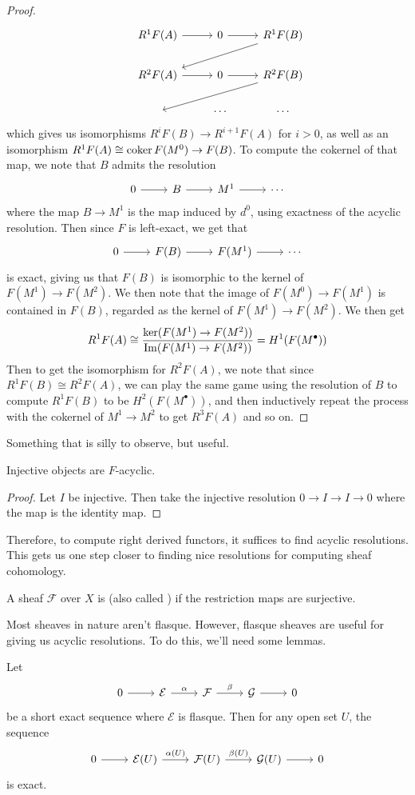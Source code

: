 \begin{proof}
\[\begin{tikzcd}
& R^1F(A) \ar[r] & 0 \ar[r] & R^1F(B) \ar[dll] \\
& R^2F(A) \ar[r] & 0 \ar[r] & R^2F(B) \ar[dll] \\
& ~ & \cdots & \cdots
\end{tikzcd}\]
which gives us isomorphisms $R^iF(B) \to R^{i+1}F(A)$ for $i > 0$, as well as
an isomorphism $R^1F(A) \cong \operatorname{coker} F(M^0) \to F(B)$. To compute the
cokernel of that map, we note that $B$ admits the resolution
\[\begin{tikzcd}
0 \ar[r] & B \ar[r] & M^1 \ar[r] & \cdots
\end{tikzcd}\]
where the map $B \to M^1$ is the map induced by $d^0$, using exactness of the acyclic
resolution. Then since $F$ is left-exact, we get that
\[\begin{tikzcd}
0 \ar[r] & F(B) \ar[r] & F(M^1) \ar[r] & \cdots
\end{tikzcd}\]
is exact, giving us that $F(B)$ is isomorphic to the kernel of $F(M^1) \to F(M^2)$. We
then note that the image of $F(M^0) \to F(M^1)$ is contained in $F(B)$, regarded
as the kernel of $F(M^1) \to F(M^2)$. We then get
\[
R^1F(A) \cong \frac{\ker(F(M^1) \to F(M^2))}{\operatorname{Im}(F(M^1) \to F(M^2))}
= H^1(F(M^\bullet))
\]
Then to get the isomorphism for $R^2F(A)$, we note that since
$R^1F(B) \cong R^2F(A)$, we can play the same game using the resolution of $B$
to compute $R^1F(B)$ to be $H^2(F(M^\bullet))$, and then inductively repeat
the process with the cokernel of $M^1 \to M^2$ to get $R^3F(A)$ and so on.
\end{proof}
%
Something that is silly to observe, but useful.
%
\begin{prop}
Injective objects are $F$-acyclic.
\end{prop}
%
\begin{proof}
Let $I$ be injective. Then take the injective resolution $0 \to I \to I \to 0$
where the map is the identity map.
\end{proof}
%
Therefore, to compute right derived functors, it suffices to find acyclic resolutions.
This gets us one step closer to finding nice resolutions for computing sheaf cohomology.
%
\begin{defn}
A sheaf $\mathcal{F}$ over $X$ is  (also called ) if
the restriction maps are surjective.
\end{defn}
%
Most sheaves in nature aren't flasque. However, flasque sheaves are useful for giving
us acyclic resolutions. To do this, we'll need some lemmas.
%
\begin{lem}
Let
\[\begin{tikzcd}
0 \ar[r] & \mathcal{E} \ar[r, "\alpha"] & \mathcal{F} \ar[r,"\beta"]
& \mathcal{G} \ar[r] & 0
\end{tikzcd}\]
be a short exact sequence where $\mathcal{E}$ is flasque. Then for any open set $U$,
the sequence
\[\begin{tikzcd}
0 \ar[r] & \mathcal{E}(U) \ar[r, "\alpha(U)"] & \mathcal{F}(U) \ar[r, "\beta(U)"]
& \mathcal{G}(U) \ar[r] & 0
\end{tikzcd}\]
is exact.
\end{lem}
